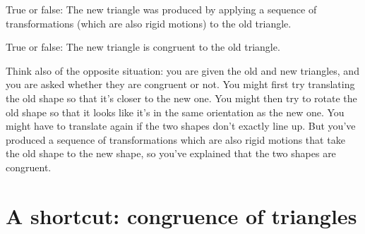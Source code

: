 \documentclass{ximera}
\begin{document}
\begin{example}
\begin{question}
True or false: The new triangle was produced by applying a sequence of transformations (which are also rigid motions) to the old triangle.
\begin{multipleChoice}
\end{multipleChoice}
\end{question}

\begin{question}
True or false: The new triangle is congruent to the old triangle.
\begin{multipleChoice}
\end{multipleChoice}
\end{question}

\end{example}

Think also of the opposite situation: you are given the old and new triangles, and you are asked whether they are congruent or not. You might first try translating the old shape so that it's closer to the new one. You might then try to rotate the old shape so that it looks like it's in the same orientation as the new one. You might have to translate again if the two shapes don't exactly line up. But you've produced a sequence of transformations which are also rigid motions that take the old shape to the new shape, so you've explained that the two shapes are congruent.



\section{A shortcut: congruence of triangles}
\end{document}
